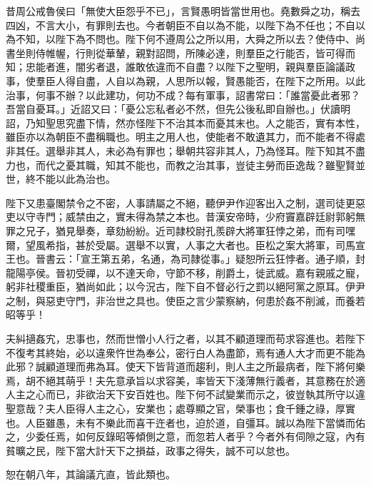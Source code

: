 \begin{pinyinscope}
昔周公戒魯侯曰「無使大臣怨乎不已」，言賢愚明皆當世用也。堯數舜之功，稱去四凶，不言大小，有罪則去也。今者朝臣不自以為不能，以陛下為不任也；不自以為不知，以陛下為不問也。陛下何不遵周公之所以用，大舜之所以去？使侍中、尚書坐則侍帷幄，行則從華輦，親對詔問，所陳必達，則羣臣之行能否，皆可得而知；忠能者進，闇劣者退，誰敢依違而不自盡？以陛下之聖明，親與羣臣論議政事，使羣臣人得自盡，人自以為親，人思所以報，賢愚能否，在陛下之所用。以此治事，何事不辦？以此建功，何功不成？每有軍事，詔書常曰：「誰當憂此者邪？吾當自憂耳。」近詔又曰：「憂公忘私者必不然，但先公後私即自辦也。」伏讀明詔，乃知聖思究盡下情，然亦怪陛下不治其本而憂其末也。人之能否，實有本性，雖臣亦以為朝臣不盡稱職也。明主之用人也，使能者不敢遺其力，而不能者不得處非其任。選舉非其人，未必為有罪也；舉朝共容非其人，乃為怪耳。陛下知其不盡力也，而代之憂其職，知其不能也，而教之治其事，豈徒主勞而臣逸哉？雖聖賢並世，終不能以此為治也。

陛下又患臺閣禁令之不密，人事請屬之不絕，聽伊尹作迎客出入之制，選司徒更惡吏以守寺門；威禁由之，實未得為禁之本也。昔漢安帝時，少府竇嘉辟廷尉郭躬無罪之兄子，猶見舉奏，章劾紛紛。近司隷校尉孔羨辟大將軍狂悖之弟，而有司嘿爾，望風希指，甚於受屬。選舉不以實，人事之大者也。臣松之案大將軍，司馬宣王也。晉書云：「宣王第五弟，名通，為司隷從事。」疑恕所云狂悖者。通子順，封龍陽亭侯。晉初受禪，以不達天命，守節不移，削爵土，徙武威。嘉有親戚之寵，躬非社稷重臣，猶尚如此；以今況古，陛下自不督必行之罰以絕阿黨之原耳。伊尹之制，與惡吏守門，非治世之具也。使臣之言少蒙察納，何患於姦不削滅，而養若昭等乎！

夫糾擿姦宄，忠事也，然而世憎小人行之者，以其不顧道理而苟求容進也。若陛下不復考其終始，必以違衆忤世為奉公，密行白人為盡節，焉有通人大才而更不能為此邪？誠顧道理而弗為耳。使天下皆背道而趨利，則人主之所最病者，陛下將何樂焉，胡不絕其萌乎！夫先意承旨以求容美，率皆天下淺薄無行義者，其意務在於適人主之心而已，非欲治天下安百姓也。陛下何不試變業而示之，彼豈執其所守以違聖意哉？夫人臣得人主之心，安業也；處尊顯之官，榮事也；食千鍾之祿，厚實也。人臣雖愚，未有不樂此而喜干迕者也，迫於道，自彊耳。誠以為陛下當憐而佑之，少委任焉，如何反錄昭等傾側之意，而忽若人者乎？今者外有伺隙之寇，內有貧曠之民，陛下當大計天下之損益，政事之得失，誠不可以怠也。

恕在朝八年，其論議亢直，皆此類也。


\end{pinyinscope}

